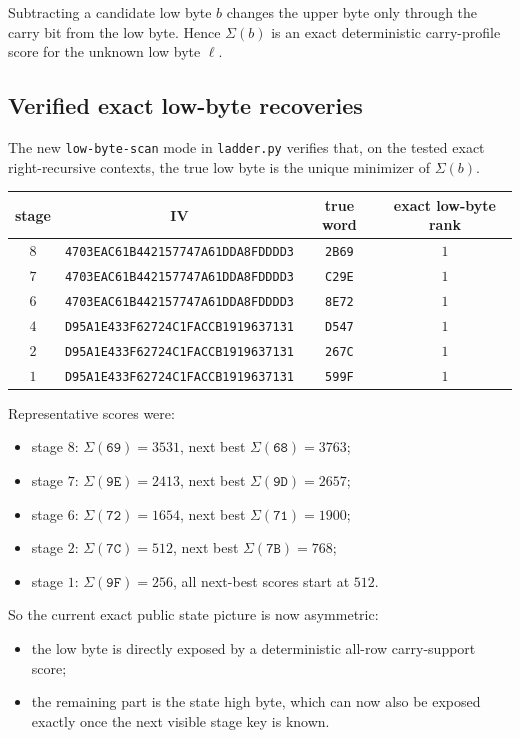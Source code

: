 \documentclass[11pt]{article}
\begin{document}
Subtracting a candidate low byte $b$ changes the upper byte only through the carry bit from the low byte. Hence $\Sigma(b)$ is an exact deterministic carry-profile score for the unknown low byte $\ell$.

\subsection*{Verified exact low-byte recoveries}
The new \texttt{low-byte-scan} mode in \texttt{ladder.py} verifies that, on the tested exact right-recursive contexts, the true low byte is the unique minimizer of $\Sigma(b)$.

\begin{center}
\begin{tabular}{cccc}
\toprule
stage & IV & true word & exact low-byte rank \\
\midrule
$8$ & \texttt{4703EAC61B442157747A61DDA8FDDDD3} & \texttt{2B69} & $1$ \\
$7$ & \texttt{4703EAC61B442157747A61DDA8FDDDD3} & \texttt{C29E} & $1$ \\
$6$ & \texttt{4703EAC61B442157747A61DDA8FDDDD3} & \texttt{8E72} & $1$ \\
$4$ & \texttt{D95A1E433F62724C1FACCB1919637131} & \texttt{D547} & $1$ \\
$2$ & \texttt{D95A1E433F62724C1FACCB1919637131} & \texttt{267C} & $1$ \\
$1$ & \texttt{D95A1E433F62724C1FACCB1919637131} & \texttt{599F} & $1$ \\
\bottomrule
\end{tabular}
\end{center}

Representative scores were:
\begin{itemize}
\item stage $8$: $\Sigma(\texttt{69})=3531$, next best $\Sigma(\texttt{68})=3763$;
\item stage $7$: $\Sigma(\texttt{9E})=2413$, next best $\Sigma(\texttt{9D})=2657$;
\item stage $6$: $\Sigma(\texttt{72})=1654$, next best $\Sigma(\texttt{71})=1900$;
\item stage $2$: $\Sigma(\texttt{7C})=512$, next best $\Sigma(\texttt{7B})=768$;
\item stage $1$: $\Sigma(\texttt{9F})=256$, all next-best scores start at $512$.
\end{itemize}

So the current exact public state picture is now asymmetric:
\begin{itemize}
\item the low byte is directly exposed by a deterministic all-row carry-support score;
\item the remaining part is the state high byte, which can now also be exposed exactly once the next visible stage key is known.
\end{itemize}
\end{document}
